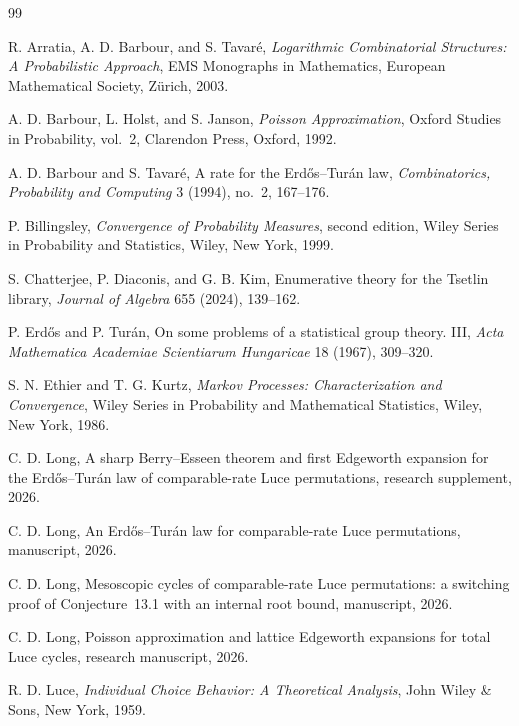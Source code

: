 \documentclass[11pt]{article}
\theoremstyle{definition}
\theoremstyle{remark}
\begin{document}
\begin{thebibliography}{99}

R. Arratia, A. D. Barbour, and S. Tavar\'e,
\newblock \emph{Logarithmic Combinatorial Structures: A Probabilistic
Approach},
\newblock EMS Monographs in Mathematics, European Mathematical Society,
Z\"urich, 2003.

A. D. Barbour, L. Holst, and S. Janson,
\newblock \emph{Poisson Approximation},
\newblock Oxford Studies in Probability, vol.~2, Clarendon Press, Oxford,
1992.

A. D. Barbour and S. Tavar\'e,
\newblock A rate for the Erd\H{o}s--Tur\'an law,
\newblock \emph{Combinatorics, Probability and Computing} 3 (1994), no.~2,
167--176.

P. Billingsley,
\newblock \emph{Convergence of Probability Measures}, second edition,
\newblock Wiley Series in Probability and Statistics, Wiley, New York, 1999.

S. Chatterjee, P. Diaconis, and G. B. Kim,
\newblock Enumerative theory for the Tsetlin library,
\newblock \emph{Journal of Algebra} 655 (2024), 139--162.

P. Erd\H{o}s and P. Tur\'an,
\newblock On some problems of a statistical group theory. III,
\newblock \emph{Acta Mathematica Academiae Scientiarum Hungaricae} 18
(1967), 309--320.

S. N. Ethier and T. G. Kurtz,
\newblock \emph{Markov Processes: Characterization and Convergence},
\newblock Wiley Series in Probability and Mathematical Statistics, Wiley,
New York, 1986.

C. D. Long,
\newblock A sharp Berry--Esseen theorem and first Edgeworth expansion for the
Erd\H{o}s--Tur\'an law of comparable-rate Luce permutations,
\newblock research supplement, 2026.

C. D. Long,
\newblock An Erd\H{o}s--Tur\'an law for comparable-rate Luce permutations,
\newblock manuscript, 2026.

C. D. Long,
\newblock Mesoscopic cycles of comparable-rate Luce permutations: a
switching proof of Conjecture~13.1 with an internal root bound,
\newblock manuscript, 2026.

C. D. Long,
\newblock Poisson approximation and lattice Edgeworth expansions for total
Luce cycles,
\newblock research manuscript, 2026.

R. D. Luce,
\newblock \emph{Individual Choice Behavior: A Theoretical Analysis},
\newblock John Wiley \& Sons, New York, 1959.

\end{thebibliography}
\end{document}

